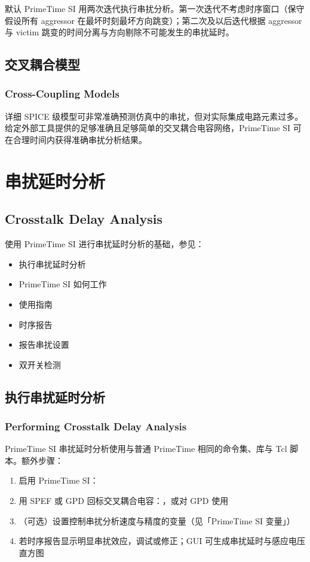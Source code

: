 默认 PrimeTime SI 用两次迭代执行串扰分析。第一次迭代不考虑时序窗口（保守假设所有 aggressor 在最坏时刻最坏方向跳变）；第二次及以后迭代根据 aggressor 与 victim 跳变的时间分离与方向剔除不可能发生的串扰延时。

\subsection{交叉耦合模型}
\subsubsection*{Cross-Coupling Models}


详细 SPICE 级模型可非常准确预测仿真中的串扰，但对实际集成电路元素过多。给定外部工具提供的足够准确且足够简单的交叉耦合电容网络，PrimeTime SI 可在合理时间内获得准确串扰分析结果。


\section{串扰延时分析}
\subsection*{Crosstalk Delay Analysis}

使用 PrimeTime SI 进行串扰延时分析的基础，参见：
\begin{itemize}
  \item 执行串扰延时分析
  \item PrimeTime SI 如何工作
  \item 使用指南
  \item 时序报告
  \item 报告串扰设置
  \item 双开关检测
\end{itemize}

\subsection{执行串扰延时分析}
\subsubsection*{Performing Crosstalk Delay Analysis}

PrimeTime SI 串扰延时分析使用与普通 PrimeTime 相同的命令集、库与 Tcl 脚本。额外步骤：
\begin{enumerate}
  \item 启用 PrimeTime SI：
  \item 用 SPEF 或 GPD 回标交叉耦合电容：，或对 GPD 使用 
  \item （可选）设置控制串扰分析速度与精度的变量（见「PrimeTime SI 变量」）
  \item 若时序报告显示明显串扰效应，调试或修正；GUI 可生成串扰延时与感应电压直方图
\end{enumerate}

